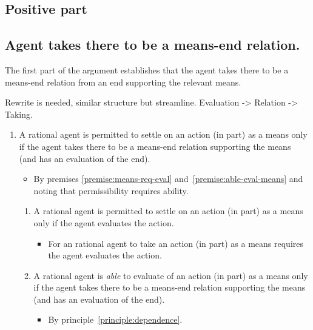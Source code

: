 \documentclass[10pt]{article}
\newcommand{\hozlinedash}[0]{%
  \noindent\hdashrule[0.5ex][c]{\textwidth}{.1pt}{2.5pt}
}
\begin{document}
\subsection{Positive part}
\label{sec:positive-part}

\subsection{Agent takes there to be a means-end relation.}
\label{sec:means-end-relation}

The first part of the argument establishes that the agent takes there to be a means-end relation from an end supporting the relevant means.

{\color{red} Rewrite is needed, similar structure but streamline.
Evaluation -> Relation -> Taking.}

\hozlinedash

\begin{enumerate}[label=P\arabic*., ref=(P\arabic*)]
\item A rational agent is permitted to settle on an action (in part) as a means only if the agent takes there to be a means-end relation supporting the means (and has an evaluation of the end).
    \begin{itemize}
    \item By premises \ref{premise:means-req-eval} and~\ref{premise:able-eval-means} and noting that permissibility requires ability.
    \end{itemize}
  \begin{enumerate}[label=P\arabic{enumi}\alph*., ref=(P\arabic{enumi}\alph*)]
  \item A rational agent is permitted to settle on an action (in part) as a means only if the agent evaluates the action.
    \begin{itemize}
    \item For an rational agent to take an action (in part) as a means requires the agent evaluates the action.
    \end{itemize}
  \item A rational agent is \emph{able} to evaluate of an action (in part) as a means only if the agent takes there to be a means-end relation supporting the means (and has an evaluation of the end).
    \begin{itemize}
    \item By principle~\ref{principle:dependence}.
    \end{itemize}
  \end{enumerate}
\end{enumerate}
\end{document}
